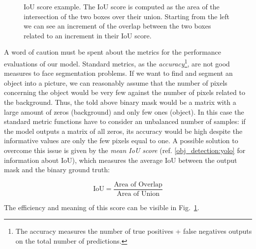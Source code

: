 \documentclass{standalone}
\begin{document}
\begin{center}
\begin{figure}[htbp]
\centering
\def\svgwidth{0.85\textwidth}

\caption{IoU score example.
The IoU score is computed as the area of the intersection of the two boxes over their union.
Starting from the left we can see an increment of the overlap between the two boxes related to an increment in their IoU score.
}
\label{fig:iou_example}
\end{figure}
\end{center}

A word of caution must be spent about the metrics for the performance evaluations of our model.
Standard metrics, as the \emph{accuracy}\footnote{
  The accuracy measures the number of true positives + false negatives outputs on the total number of predictions.
}, are not good measures to face segmentation problems.
If we want to find and segment an object into a picture, we can reasonably assume that the number of pixels concerning the object would be very few against the number of pixels related to the background.
Thus, the told above binary mask would be a matrix with a large amount of zeros (background) and only few ones (object).
In this case the standard metric functions have to consider an unbalanced number of samples: if the model outputs a matrix of all zeros, its accuracy would be high despite the informative values are only the few pixels equal to one.
A possible solution to overcome this issue is given by the \emph{mean IoU score} (ref. \ref{obj_detection:yolo} for information about IoU), which measures the average IoU between the output mask and the binary ground truth:

\begin{equation}
\mbox{IoU} = \frac{\mbox{Area of Overlap}}{\mbox{Area of Union}}
\end{equation}

The efficiency and meaning of this score can be visible in Fig.~\ref{fig:iou_example}.
\end{document}

